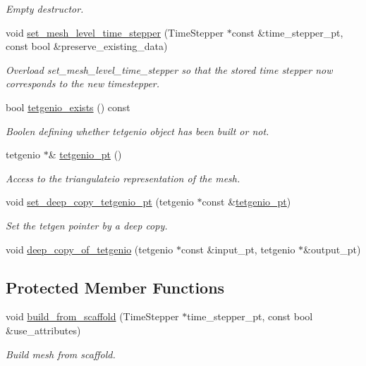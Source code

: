 \begin{DoxyCompactItemize}
\begin{DoxyCompactList}\small\item\em Empty destructor. \end{DoxyCompactList}\item 
void \hyperlink{classoomph_1_1TetgenMesh_a9c0441ea7404e7ea404979955ffbb5dd}{set\+\_\+mesh\+\_\+level\+\_\+time\+\_\+stepper} (Time\+Stepper $\ast$const \&time\+\_\+stepper\+\_\+pt, const bool \&preserve\+\_\+existing\+\_\+data)
\begin{DoxyCompactList}\small\item\em Overload set\+\_\+mesh\+\_\+level\+\_\+time\+\_\+stepper so that the stored time stepper now corresponds to the new timestepper. \end{DoxyCompactList}\item 
bool \hyperlink{classoomph_1_1TetgenMesh_aeab19209f141e65511a52f195d89d6ac}{tetgenio\+\_\+exists} () const
\begin{DoxyCompactList}\small\item\em Boolen defining whether tetgenio object has been built or not. \end{DoxyCompactList}\item 
tetgenio $\ast$\& \hyperlink{classoomph_1_1TetgenMesh_a47071bb8a8c0df965a5e013f0a8fb1ba}{tetgenio\+\_\+pt} ()
\begin{DoxyCompactList}\small\item\em Access to the triangulateio representation of the mesh. \end{DoxyCompactList}\item 
void \hyperlink{classoomph_1_1TetgenMesh_a8758320eb646d20b578414c35145f0d7}{set\+\_\+deep\+\_\+copy\+\_\+tetgenio\+\_\+pt} (tetgenio $\ast$const \&\hyperlink{classoomph_1_1TetgenMesh_a47071bb8a8c0df965a5e013f0a8fb1ba}{tetgenio\+\_\+pt})
\begin{DoxyCompactList}\small\item\em Set the tetgen pointer by a deep copy. \end{DoxyCompactList}\item 
void \hyperlink{classoomph_1_1TetgenMesh_a93e764a63a21a93d4a2548058eb1a7c4}{deep\+\_\+copy\+\_\+of\+\_\+tetgenio} (tetgenio $\ast$const \&input\+\_\+pt, tetgenio $\ast$\&output\+\_\+pt)
\end{DoxyCompactItemize}
\subsection*{Protected Member Functions}
\begin{DoxyCompactItemize}
\item 
void \hyperlink{classoomph_1_1TetgenMesh_a3b0d214cb14243f7ecc2c82e6641930b}{build\+\_\+from\+\_\+scaffold} (Time\+Stepper $\ast$time\+\_\+stepper\+\_\+pt, const bool \&use\+\_\+attributes)
\begin{DoxyCompactList}\small\item\em Build mesh from scaffold. \end{DoxyCompactList}\end{DoxyCompactItemize}
